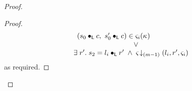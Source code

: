 \begin{lemma}[]
\begin{proof}
\begin{proof}
\begin{align}
\begin{array}{l}
\begin{array}{l}
	  	(s_0 \composeL c,\ s'_0 \composeL c) \in \amod{i}(\ca{}) \\ 	
	  \end{array} \\
	  \hspace*{3cm}\lor\\
	  \exsts{r'} s_2 = l_i \composeL r' \;\land\; \extendsAMUpto{\amod{}}{(m-1)}{l_i}{r'}{\amod{i}}
	\end{array} \nonumber
\end{align}
as required.
\renewcommand{\qed}{}
\end{proof}
\end{proof}
\end{lemma}